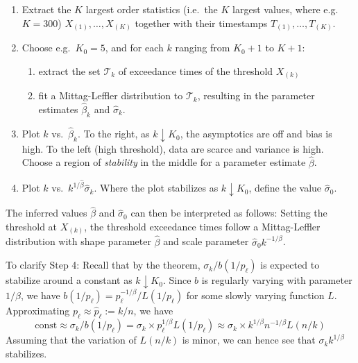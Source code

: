 \documentclass[]{elsarticle} %
\providecommand{\tightlist}{%
  \setlength{\itemsep}{0pt}\setlength{\parskip}{0pt}}
\begin{document}
\begin{enumerate}
\def\labelenumi{\arabic{enumi}.}
\item
  Extract the \(K\) largest order statistics (i.e.~the \(K\) largest
  values, where e.g.~\(K = 300\)) \(X_{(1)}, \ldots, X_{(K)}\) together
  with their timestamps \(T_{(1)}, \ldots, T_{(K)}\).
\item
  Choose e.g.~\(K_0 = 5\), and for each \(k\) ranging from \(K_0 +1\) to
  \(K + 1\):

  \begin{enumerate}
  \def\labelenumii{\alph{enumii})}
  \tightlist
  \item
    extract the set \(\mathcal T_k\) of exceedance times of the
    threshold \(X_{(k)}\)
  \item
    fit a Mittag-Leffler distribution to \(\mathcal T_k\), resulting in
    the parameter estimates \(\hat\beta_k\) and \(\hat \sigma_k\).
  \end{enumerate}
\item
  Plot \(k\) vs.~\(\hat \beta_k\). To the right, as
  \(k \downarrow K_0\), the asymptotics are off and bias is high. To the
  left (high threshold), data are scarce and variance is high. Choose a
  region of \emph{stability} in the middle for a parameter estimate
  \(\hat \beta\).
\item
  Plot \(k\) vs.~\(k^{1/\hat \beta} \hat \sigma_k\). Where the plot
  stabilizes as \(k \downarrow K_0\), define the value
  \(\hat \sigma_0\).
\end{enumerate}

The inferred values \(\hat \beta\) and \(\hat \sigma_0\) can then be
interpreted as follows: Setting the threshold at \(X_{(k)}\), the
threshold exceedance times follow a Mittag-Leffler distribution with
shape parameter \(\hat \beta\) and scale parameter
\(\hat \sigma_0 k^{-1/\beta}\).

To clarify Step 4: Recall that by the theorem,
\(\sigma_k / b(1/p_{\ell})\) is expected to stabilize around a constant
as \(k \downarrow K_0\). Since \(b\) is regularly varying with parameter
\(1/\beta\), we have
\(b(1/p_{\ell}) = p_{\ell}^{-1/\beta} / L(1/p_{\ell})\) for some slowly
varying function \(L\). Approximating
\(p_{\ell} \approx \hat p_{\ell} := k / n\), we have
\[\text{const} \approx \sigma_k / b(1/p_{\ell}) = \sigma_k \times p_{\ell}^{1/\beta} L(1/p_{\ell}) \approx \sigma_k \times k^{1/\beta} n^{-1/\beta} L(n/k)\]
Assuming that the variation of \(L(n/k)\) is minor, we can hence see
that \(\sigma_k k^{1/\beta}\) stabilizes.
\end{document}
